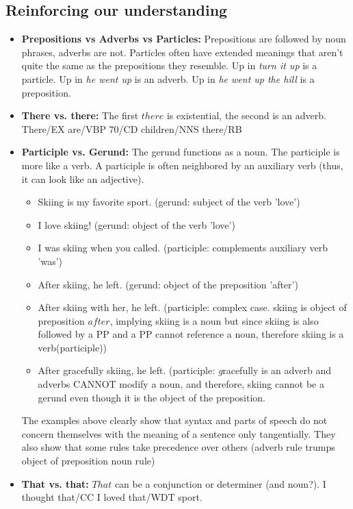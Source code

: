 \documentclass[11pt]{article}
\begin{document}
	\subsection*{Reinforcing our understanding}
		\begin{itemize}
			\item \textbf{Prepositions vs Adverbs vs Particles:} Prepositions are followed by noun phrases, adverbs are not. 
				Particles often have extended meanings that aren't quite the same as the prepositions they resemble. Up in 
				\textit{turn it up} is a particle. Up in 
			\textit{he went up} is an adverb. Up in \textit{he went up the hill} is a preposition. 
		
			\item \textbf{There vs. there:} The first $there$ is existential, the second is an adverb. There/EX are/VBP 70/CD 
				children/NNS there/RB
			
			\item \textbf{Participle vs. Gerund:} The gerund functions as a noun. The participle is more like a verb. A participle 
				is often neighbored
				by an auxiliary verb (thus, it can look like an adjective). 
					\begin{itemize}
						\item Skiing is my favorite sport. (gerund: subject of the verb 'love')
						\item I love skiing! (gerund: object of the verb 'love')
						\item I was skiing when you called. (participle: complements auxiliary verb 'was')
						\item After skiing, he left. (gerund: object of the preposition 'after')
						\item After skiing with her, he left. (participle: complex case. skiing is object of preposition $after$,
							implying skiing is a noun but since skiing is also followed by a PP and a PP cannot 
							reference a noun, therefore skiing is a verb(participle))
						\item After gracefully skiing, he left. (participle: \textit gracefully is an adverb and adverbs 
							CANNOT modify a noun, and therefore, skiing cannot be a gerund even though it is the 
							object of the preposition. 
					\end{itemize}
				The examples above clearly show that syntax and parts of speech do not concern themselves with the 
				meaning of a sentence only tangentially. They also show that some rules take precedence over others 
				(adverb rule trumps  object of preposition noun rule)
			\item \textbf{That vs. that:} $That$ can be a conjunction or determiner (and noun?). I thought that/CC I loved 
				that/WDT sport. 
		\end{itemize}
		
\end{document}
